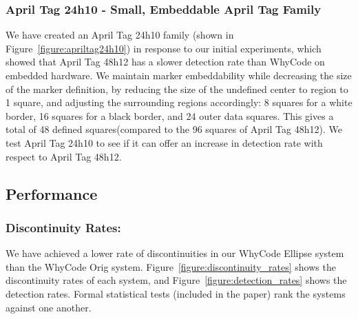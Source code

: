 \subsubsection{April Tag 24h10 - Small, Embeddable April Tag Family}
We have created an April Tag 24h10 family (shown in Figure~\ref{figure:apriltag24h10}) in response to our
initial experiments, which showed that April Tag 48h12 has a slower detection rate than WhyCode on embedded hardware.
We maintain marker embeddability while decreasing the size of the marker definition,
by reducing the size of the undefined center to region to 1 square, and adjusting the surrounding regions accordingly:
8 squares for a white border, 16 squares for a black border, and 24 outer data squares.
This gives a total of 48 defined squares(compared to the 96 squares of April Tag 48h12).
We test April Tag 24h10 to see if it can offer an increase in detection rate with respect to April Tag 48h12.

\subsection{Performance}

\subsubsection{Discontinuity Rates:}
We have achieved a lower rate of discontinuities in our WhyCode Ellipse system than the WhyCode Orig system.
Figure~\ref{figure:discontinuity_rates} shows the discontinuity rates of each system,
and Figure~\ref{figure:detection_rates} shows the detection rates.
Formal statistical tests (included in the paper) rank the systems against one another.

